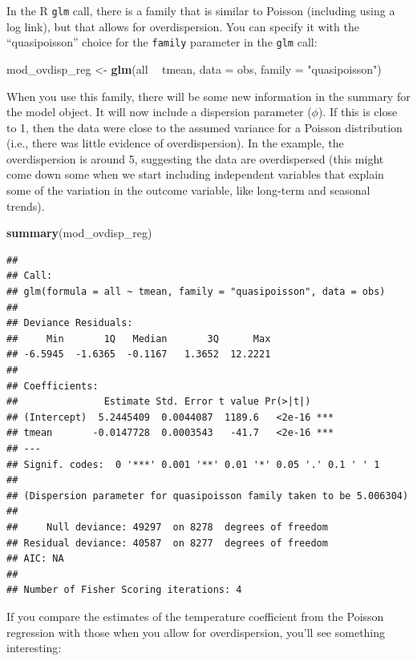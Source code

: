 \documentclass[
]{book}
\newenvironment{Shaded}{\begin{snugshade}}{\end{snugshade}}
\newcommand{\DataTypeTok}[1]{\textcolor[rgb]{0.13,0.29,0.53}{#1}}
\newcommand{\KeywordTok}[1]{\textcolor[rgb]{0.13,0.29,0.53}{\textbf{#1}}}
\newcommand{\NormalTok}[1]{#1}
\newcommand{\OperatorTok}[1]{\textcolor[rgb]{0.81,0.36,0.00}{\textbf{#1}}}
\newcommand{\StringTok}[1]{\textcolor[rgb]{0.31,0.60,0.02}{#1}}
\begin{document}
In the R \texttt{glm} call, there is a family that is similar to Poisson (including
using a log link), but that allows for overdispersion. You can specify it
with the ``quasipoisson'' choice for the \texttt{family} parameter in the \texttt{glm} call:

\begin{Shaded}
\begin{Highlighting}[]
\NormalTok{mod_ovdisp_reg <-}\StringTok{ }\KeywordTok{glm}\NormalTok{(all }\OperatorTok{~}\StringTok{ }\NormalTok{tmean, }\DataTypeTok{data =}\NormalTok{ obs, }\DataTypeTok{family =} \StringTok{"quasipoisson"}\NormalTok{)}
\end{Highlighting}
\end{Shaded}

When you use this family, there will be some new information in the summary
for the model object. It will now include a dispersion parameter (\(\phi\)). If this
is close to 1, then the data were close to the assumed variance for a Poisson
distribution (i.e., there was little evidence of overdispersion). In the
example, the overdispersion is around 5, suggesting the data are overdispersed
(this might come down some when we start including independent variables that
explain some of the variation in the outcome variable, like long-term and
seasonal trends).

\begin{Shaded}
\begin{Highlighting}[]
\KeywordTok{summary}\NormalTok{(mod_ovdisp_reg)}
\end{Highlighting}
\end{Shaded}

\begin{verbatim}
## 
## Call:
## glm(formula = all ~ tmean, family = "quasipoisson", data = obs)
## 
## Deviance Residuals: 
##     Min       1Q   Median       3Q      Max  
## -6.5945  -1.6365  -0.1167   1.3652  12.2221  
## 
## Coefficients:
##               Estimate Std. Error t value Pr(>|t|)    
## (Intercept)  5.2445409  0.0044087  1189.6   <2e-16 ***
## tmean       -0.0147728  0.0003543   -41.7   <2e-16 ***
## ---
## Signif. codes:  0 '***' 0.001 '**' 0.01 '*' 0.05 '.' 0.1 ' ' 1
## 
## (Dispersion parameter for quasipoisson family taken to be 5.006304)
## 
##     Null deviance: 49297  on 8278  degrees of freedom
## Residual deviance: 40587  on 8277  degrees of freedom
## AIC: NA
## 
## Number of Fisher Scoring iterations: 4
\end{verbatim}

If you compare the estimates of the temperature coefficient from the Poisson
regression with those when you allow for overdispersion, you'll see something
interesting:
\end{document}
